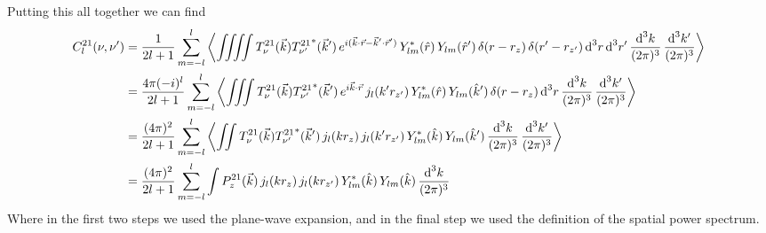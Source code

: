 \begin{bibunit}
Putting this all together we can find
\begin{align*}
    C^{21}_l(\nu, \nu^\prime) &=
        \frac{1}{2l+1}\sum_{m=-l}^l
        \left\langle
            \iiiint
            T_\nu^{21}(\vec k) {T_{\nu^\prime}^{21}}^*(\vec k^\prime) \,
            e^{i(\vec k\cdot\vec r - \vec k^\prime\cdot\vec r^\prime)} \,
            Y_{lm}^*(\hat r) \,
            Y_{lm}(\hat r^\prime) \,
            \delta(r - r_z) \,
            \delta(r^\prime - r_{z^\prime}) \,
            {\textrm d}^3r \,
            {\textrm d}^3r^\prime \,
            \frac{{\textrm d}^3k}{(2\pi)^3} \,
            \frac{{\textrm d}^3k^\prime}{(2\pi)^3}
        \right\rangle \\
    &=
        \frac{4\pi(-i)^l}{2l+1}\sum_{m=-l}^l
        \left\langle
            \iiint
            T_\nu^{21}(\vec k) {T_{\nu^\prime}^{21}}^*(\vec k^\prime) \,
            e^{i\vec k\cdot\vec r} \,
            j_l(k^\prime r_{z^\prime}) \,
            Y_{lm}^*(\hat r) \,
            Y_{lm}(\hat k^\prime) \,
            \delta(r - r_z) \,
            {\textrm d}^3r \,
            \frac{{\textrm d}^3k}{(2\pi)^3} \,
            \frac{{\textrm d}^3k^\prime}{(2\pi)^3}
        \right\rangle \\
    &=
        \frac{(4\pi)^2}{2l+1}\sum_{m=-l}^l
        \left\langle
            \iint
            T_\nu^{21}(\vec k) {T_{\nu^\prime}^{21}}^*(\vec k^\prime) \,
            j_l(k r_z) \,
            j_l(k^\prime r_{z^\prime}) \,
            Y_{lm}^*(\hat k) \,
            Y_{lm}(\hat k^\prime) \,
            \frac{{\textrm d}^3k}{(2\pi)^3} \,
            \frac{{\textrm d}^3k^\prime}{(2\pi)^3}
        \right\rangle \\
    &=
        \frac{(4\pi)^2}{2l+1}\sum_{m=-l}^l
        \int
        P_z^{21}(\vec k) \,
        j_l(k r_z) \,
        j_l(k r_{z^\prime}) \,
        Y_{lm}^*(\hat k) \,
        Y_{lm}(\hat k) \,
        \frac{{\textrm d}^3k}{(2\pi)^3} \\
\end{align*}
Where in the first two steps we used the plane-wave expansion, and in the final step we used the
definition of the spatial power spectrum.


\end{bibunit}
